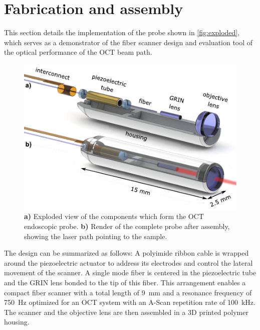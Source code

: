 \documentclass[10pt]{iopart}
\begin{document}
\section{Fabrication and assembly}

This section details the implementation of the probe shown in \autoref{fig:exploded}, which serves as a demonstrator of the fiber scanner design and evaluation tool of the optical performance of the OCT beam path.

\begin{figure}[h!]\centering \includegraphics[width=\columnwidth]{figures/explodedRenderNames.pdf}
      \caption{\textbf{a)} Exploded view of the components which form the OCT endoscopic probe.
      \textbf{b)} Render of the complete probe after assembly, showing the laser path pointing to the sample.}
      \label{fig:exploded}
\end{figure}

The design can be summarized as follows: A polyimide ribbon cable is wrapped around the piezoelectric actuator to address its electrodes and control the lateral movement of the scanner. A single mode fiber is centered in the piezoelectric tube and the GRIN lens bonded to the tip of this fiber. This arrangement enables a compact fiber scanner with a total length of \SI{9}{\milli\meter} and a resonance frequency of \SI{750}{\hertz} optimized for an OCT system with an A-Scan repetition rate of \SI{100}{\kilo\hertz}. The scanner and the objective lens are then assembled in a 3D printed polymer housing.
\end{document}
